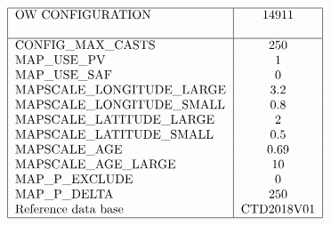 \documentclass[11pt,titlepage]{article}
\begin{document}
\pagestyle{plain}
\begin{table}[h]
$$
\begin{tabular}{|l|c|}
\hline
OW CONFIGURATION 		& 14911     	\\
				&                \\
\hline
CONFIG\_MAX\_CASTS		& 250     	\\
MAP\_USE\_PV			& 1       	\\
MAP\_USE\_SAF		        & 0        	\\
MAPSCALE\_LONGITUDE\_LARGE	& 3.2     	\\
MAPSCALE\_LONGITUDE\_SMALL	& 0.8        \\
MAPSCALE\_LATITUDE\_LARGE 	& 2           \\
MAPSCALE\_LATITUDE\_SMALL 	& 0.5      \\
MAPSCALE\_AGE		 	& 0.69    \\
MAPSCALE\_AGE\_LARGE		& 10    	\\
MAP\_P\_EXCLUDE		 	& 0      \\
MAP\_P\_DELTA		 	& 250      \\
Reference data base      	&  CTD2018V01   \\ 
\hline
\end{tabular}
$$
\label{tab3}
\end{table}
\end{document}
